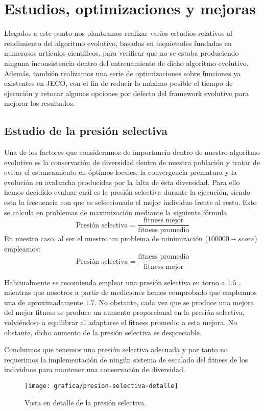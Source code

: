 \chapter{Estudios, optimizaciones y mejoras}
Llegados a este punto nos planteamos realizar varios estudios relativos al rendimiento del algoritmo evolutivo, basadas en inquietudes fundadas en numerosos artículos científicos, para verificar que no se estaba produciendo ninguna inconsistencia dentro del entrenamiento de dicho algoritmo evolutivo. Además, también realizamos una serie de optimizaciones sobre funciones ya existentes en JECO, con el fin de reducir lo máximo posible el tiempo de ejecución y retocar algunas opciones por defecto del framework evolutivo para mejorar los resultados.

\section{Estudio de la presión selectiva}
Una de los factores que consideramos de importancia dentro de nuestro algoritmo evolutivo es la conservación de diversidad dentro de nuestra población y tratar de evitar el estancamiento en óptimos locales, la convergencia prematura y la evolución en avalancha producidas por la falta de ésta diversidad. Para ello hemos decidido evaluar cuál es la presión selectiva durante la ejecución, siendo esta la frecuencia con que es seleccionado el mejor individuo frente al resto. Esto se calcula en problemas de maximización mediante la siguiente fórmula
\begin{equation}
\textrm{Presión selectiva} = \frac{\textrm{fitness mejor}}{\textrm{fitness promedio}}
\end{equation}
En nuestro caso, al ser el nuestro un problema de minimización ($100000 - score$) empleamos:
\begin{equation}
\textrm{Presión selectiva} = \frac{\textrm{fitness promedio}}{\textrm{fitness mejor}}
\end{equation}

Habitualmente se recomienda emplear una presión selectiva en torno a $1.5$ \cite{whitley1989genitor}, mientras que nosotros a partir de mediciones hemos comprobado que empleamos una de aproximadamente $1.7$. No obstante, cada vez que se produce una mejora del mejor fitness  se produce un aumento proporcional en la presión selectiva, volviéndose a equilibrar al adaptarse el fitness promedio a esta mejora. No obstante, dicho aumento de la presión selectiva es despreciable.
 
Concluimos que tenemos una presión selectiva adecuada y por tanto no requerimos la implementación de ningún sistema de escalado del fitness de los individuos para mantener una conservación de diversidad.
\begin{figure}[H]
\centering
\texttt{[image: grafica/presion-selectiva-detalle]}
\caption{Vista en detalle  de la presión selectiva.}
\end{figure}

